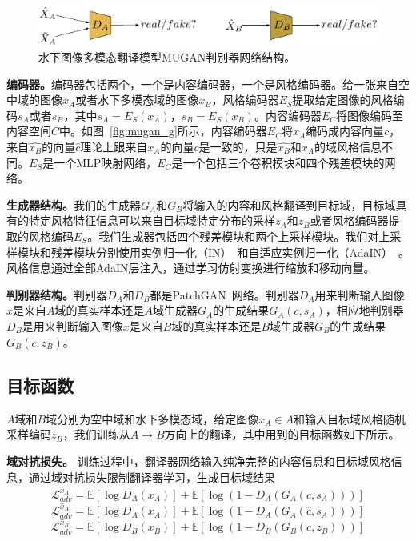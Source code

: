 \begin{figure}[ht]
    \centering
    \includegraphics[width=1\textwidth]{figures/D.pdf}
    \caption{水下图像多模态翻译模型MUGAN判别器网络结构。}
    \label{fig:mugan_d}
\end{figure}

\textbf{编码器。}编码器包括两个，一个是内容编码器，一个是风格编码器。给一张来自空中域的图像$x_A$或者水下多模态域的图像$x_B$，风格编码器$E_S$提取给定图像的风格编码$s_A$或者$s_B$，其中$s_A = E_S(x_A)$，$s_B = E_S(x_B)$。内容编码器$E_C$将图像编码至内容空间$C$中。如图~\ref{fig:mugan_g}所示，内容编码器$E_C$将$x_A$编码成内容向量$c$，来自$\hat{x_B}$的向量$\hat{c}$理论上跟来自$x_A$的向量$c$是一致的，只是$\hat{x_B}$和$x_A$的域风格信息不同。$E_S$是一个MLP映射网络，$E_C$是一个包括三个卷积模块和四个残差模块的网络。

\textbf{生成器结构。}我们的生成器$G_A$和$G_B$将输入的内容和风格翻译到目标域，目标域具有的特定风格特征信息可以来自目标域特定分布的采样$z_A$和$z_B$或者风格编码器提取的风格编码$E_S$。我们生成器包括四个残差模块和两个上采样模块。我们对上采样模块和残差模块分别使用实例归一化（IN）~\cite{ulyanov2016instance}和自适应实例归一化（AdaIN）~\cite{huang2017arbitrary}。风格信息通过全部AdaIN层注入，通过学习仿射变换进行缩放和移动向量。

\textbf{判别器结构。}判别器$D_A$和$D_B$都是PatchGAN~\cite{isola2017image}网络。判别器$D_A$用来判断输入图像$x$是来自$A$域的真实样本还是$A$域生成器$G_A$的生成结果$G_A(c,s_A)$，相应地判别器$D_B$是用来判断输入图像$x$是来自$B$域的真实样本还是$B$域生成器$G_B$的生成结果$G_B(\tilde{c},z_B)$。

\subsection{目标函数}
$A$域和$B$域分别为空中域和水下多模态域，给定图像$x_A \in A$和输入目标域风格随机采样编码$z_B$，我们训练从$A \rightarrow B$方向上的翻译，其中用到的目标函数如下所示。

\textbf{域对抗损失。} 训练过程中，翻译器网络输入纯净完整的内容信息和目标域风格信息，通过域对抗损失限制翻译器学习，生成目标域结果
\begin{equation}
\label{equ:adv_a_}
\mathcal{L}_{adv}^{\tilde{x}_A} = \mathbb{E}[\log D_A(x_A)] + \mathbb{E}[\log(1-D_A(G_A(c,s_A)))]
\end{equation}
\begin{equation}
\label{equ:adv_a}
\mathcal{L}_{adv}^{\hat{x}_A} = \mathbb{E}[\log D_A(x_A)] + \mathbb{E}[\log(1-D_A(G_A(\hat{c},s_A)))]
\end{equation}
\begin{equation}
\label{equ:adv_b}
\mathcal{L}_{adv}^{\hat{x}_B} = \mathbb{E}[\log D_B(x_B)] + \mathbb{E}[\log(1-D_B(G_B(c,z_B)))]
\end{equation}

